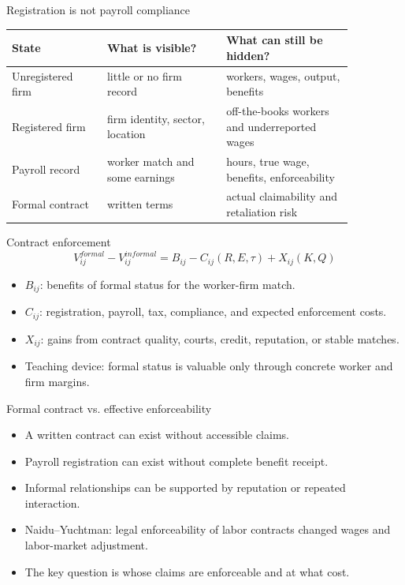 \documentclass[aspectratio=169,11pt]{beamer}
\begin{document}
\begin{frame}{Registration is not payroll compliance}
\small
\begin{tabular}{p{0.24\linewidth} p{0.30\linewidth} p{0.32\linewidth}}
\toprule
State & What is visible? & What can still be hidden? \\
\midrule
Unregistered firm & little or no firm record & workers, wages, output, benefits \\
Registered firm & firm identity, sector, location & off-the-books workers and underreported wages \\
Payroll record & worker match and some earnings & hours, true wage, benefits, enforceability \\
Formal contract & written terms & actual claimability and retaliation risk \\
\bottomrule
\end{tabular}
\end{frame}

\begin{frame}{Contract enforcement}
\[
V^{formal}_{ij}-V^{informal}_{ij}
=B_{ij}-C_{ij}(R,E,\tau)+X_{ij}(K,Q)
\]
\begin{itemize}
    \item $B_{ij}$: benefits of formal status for the worker-firm match.
    \item $C_{ij}$: registration, payroll, tax, compliance, and expected enforcement costs.
    \item $X_{ij}$: gains from contract quality, courts, credit, reputation, or stable matches.
    \item Teaching device: formal status is valuable only through concrete worker and firm margins.
\end{itemize}
\end{frame}

\begin{frame}{Formal contract vs. effective enforceability}
\begin{itemize}
    \item A written contract can exist without accessible claims.
    \item Payroll registration can exist without complete benefit receipt.
    \item Informal relationships can be supported by reputation or repeated interaction.
    \item Naidu--Yuchtman: legal enforceability of labor contracts changed wages and labor-market adjustment.
    \item The key question is whose claims are enforceable and at what cost.
\end{itemize}
\end{frame}
\end{document}

